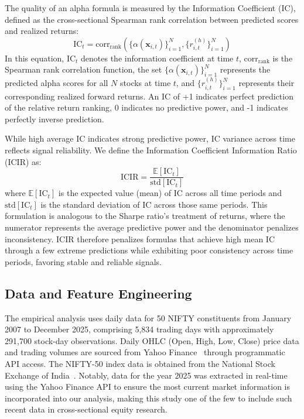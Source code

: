\documentclass{ieeeaccess}
\begin{document}
The quality of an alpha formula is measured by the Information Coefficient (IC), defined as the cross-sectional Spearman rank correlation between predicted scores and realized returns:
\begin{equation}
\text{IC}_t = \text{corr}_{\text{rank}}\left(\{\alpha(\mathbf{x}_{i,t})\}_{i=1}^N, \{r_{i,t}^{(h)}\}_{i=1}^N\right)
\label{eq:ic}
\end{equation}
In this equation, $\text{IC}_t$ denotes the information coefficient at time $t$, $\text{corr}_{\text{rank}}$ is the Spearman rank correlation function, the set $\{\alpha(\mathbf{x}_{i,t})\}_{i=1}^N$ represents the predicted alpha scores for all $N$ stocks at time $t$, and $\{r_{i,t}^{(h)}\}_{i=1}^N$ represents their corresponding realized forward returns. An IC of +1 indicates perfect prediction of the relative return ranking, 0 indicates no predictive power, and -1 indicates perfectly inverse prediction.

While high average IC indicates strong predictive power, IC variance across time reflects signal reliability. We define the Information Coefficient Information Ratio (ICIR) as:
\begin{equation}
\text{ICIR} = \frac{\mathbb{E}[\text{IC}_t]}{\text{std}[\text{IC}_t]}
\label{eq:icir}
\end{equation}
where $\mathbb{E}[\text{IC}_t]$ is the expected value (mean) of IC across all time periods and $\text{std}[\text{IC}_t]$ is the standard deviation of IC across those same periods. This formulation is analogous to the Sharpe ratio's treatment of returns, where the numerator represents the average predictive power and the denominator penalizes inconsistency. ICIR therefore penalizes formulas that achieve high mean IC through a few extreme predictions while exhibiting poor consistency across time periods, favoring stable and reliable signals.

\subsection{Data and Feature Engineering}
The empirical analysis uses daily data for 50 NIFTY constituents from January 2007 to December 2025, comprising 5,834 trading days with approximately 291,700 stock-day observations. Daily OHLC (Open, High, Low, Close) price data and trading volumes are sourced from Yahoo Finance~\cite{b31} through programmatic API access. The NIFTY-50 index data is obtained from the National Stock Exchange of India~\cite{b32}. Notably, data for the year 2025 was extracted in real-time using the Yahoo Finance API to ensure the most current market information is incorporated into our analysis, making this study one of the few to include such recent data in cross-sectional equity research.
\end{document}
